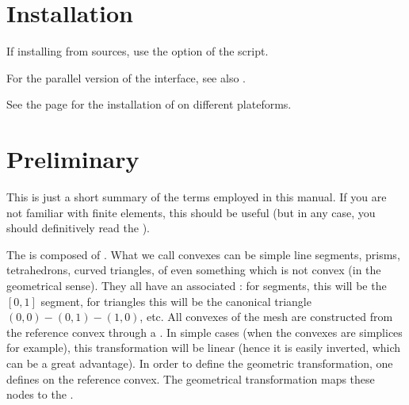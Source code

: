 \documentclass[a4paper,11pt,english]{sphinxmanual}
\begin{document}
\chapter{Installation}
\label{\detokenize{python/install:installation}}\label{\detokenize{python/install:ud-install-python}}\label{\detokenize{python/install::doc}}
If installing from sources, use the option  of the  script.

For the parallel version of the interface, see also .

See the  page for the installation of  on different plateforms.


\chapter{Preliminary}
\label{\detokenize{python/pre:preliminary}}\label{\detokenize{python/pre:py-pre}}\label{\detokenize{python/pre::doc}}
This is just a short summary of the terms employed in this manual. If you are not
familiar with finite elements, this should be useful (but in any case, you should
definitively read the ).

The  is composed of . What we call convexes can be
simple line segments, prisms, tetrahedrons, curved triangles, of even something
which is not convex (in the geometrical sense). They all have an associated
: for segments, this will be the \([0,1]\) segment,
for triangles this will be the canonical triangle \((0,0)-(0,1)-(1,0)\), etc.
All convexes of the mesh are constructed from the reference convex through a
. In simple cases (when the convexes are
simplices for example), this transformation will be linear (hence it is easily
inverted, which can be a great advantage). In order to define the geometric
transformation, one defines  on the reference convex.
The geometrical transformation maps these nodes to the .
\end{document}
